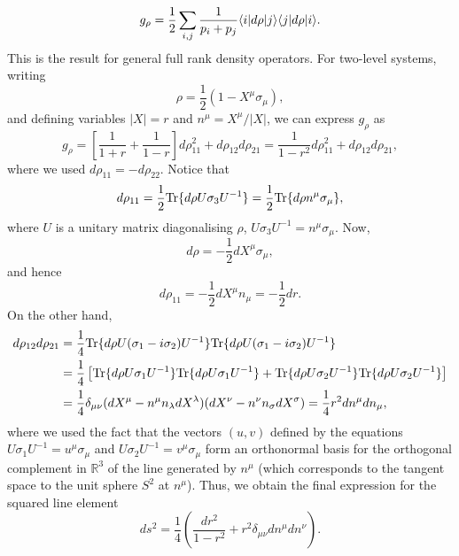 \begin{equation*}
g_{\rho}=\frac{1}{2}\sum_{i,j}\frac{1}{p_i+p_j}\langle i |d\rho| j \rangle\langle j |d\rho| i \rangle.
\end{equation*}
This is the result for general full rank density operators. For two-level systems, writing
\begin{equation*}
\rho=\frac{1}{2}(1-X^{\mu}\sigma_{\mu}),
\end{equation*}
and defining variables $|X|=r$ and $n^{\mu}=X^{\mu}/|X|$, we can express $g_{\rho}$ as
\begin{equation*}
g_{\rho}=\left[\frac{1}{1+r}+\frac{1}{1-r}\right]d\rho_{11}^2 +d\rho_{12}d\rho_{21}
=\frac{1}{1-r^2}d\rho_{11}^2+d\rho_{12}d\rho_{21},
\end{equation*}
where we used $d\rho_{11}=-d\rho_{22}$. Notice that
\begin{equation*}
d\rho_{11}=\frac{1}{2}\text{Tr}\{d\rho U\sigma_{3}U^{-1}\}=\frac{1}{2}\text{Tr}\{d\rho n^{\mu}\sigma_{\mu}\},
\end{equation*}
where $U$ is a unitary matrix diagonalising $\rho$, $U\sigma_3U^{-1}=n^{\mu}\sigma_{\mu}$. Now,
\begin{equation*}
d\rho=-\frac{1}{2}dX^{\mu}\sigma_{\mu},
\end{equation*}
and hence
\begin{equation*}
d\rho_{11}=-\frac{1}{2}dX^{\mu}n_{\mu}=-\frac{1}{2}dr.
\end{equation*}
On the other hand,
\begin{eqnarray*}
d\rho_{12}d\rho_{21}&=\frac{1}{4}\text{Tr}\{d\rho U(\sigma_1-i\sigma_2)U^{-1}\}\text{Tr}\{d\rho U(\sigma_1-i\sigma_2)U^{-1}\}\\
&=\frac{1}{4}\left[\text{Tr}\{d\rho U\sigma_1U^{-1}\}\text{Tr}\{d\rho U\sigma_1U^{-1}\}+\text{Tr}\{d\rho U\sigma_2U^{-1}\}\text{Tr}\{d\rho U\sigma_2U^{-1}\}\right]\\
&=\frac{1}{4}\delta_{\mu\nu}(dX^{\mu}-n^{\mu}n_{\lambda}dX^{\lambda})(dX^{\nu}-n^{\nu}n_{\sigma}dX^{\sigma})=\frac{1}{4}r^2dn^{\mu}dn_{\mu},
\end{eqnarray*}
where we used the fact that the vectors $(u,v)$ defined by the equations $U\sigma_1U^{-1}=u^{\mu}\sigma_{\mu}$ and $U\sigma_2U^{-1}=v^{\mu}\sigma_{\mu}$ form an orthonormal basis for the orthogonal complement in $\mathbb{R}^3$ of the line generated by $n^{\mu}$ (which corresponds to the tangent space to the unit sphere $S^2$ at $n^{\mu}$). Thus, we obtain the final expression for the squared line element
\begin{equation}
ds^2=\frac{1}{4}\left(\frac{dr^2}{1-r^2}+r^2\delta_{\mu\nu}dn^{\mu}dn^{\nu}\right).
\label{Eq: Bures Metric}
\end{equation}

